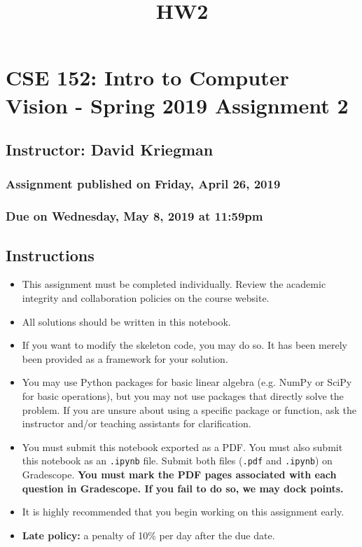 \documentclass[11pt]{article}
\title{HW2}
\providecommand{\tightlist}{%
      \setlength{\itemsep}{0pt}\setlength{\parskip}{0pt}}
\begin{document}
    
    
    \maketitle
    
    

    
    \section{CSE 152: Intro to Computer Vision - Spring 2019 Assignment
2}\label{cse-152-intro-to-computer-vision---spring-2019-assignment-2}

\subsection{Instructor: David Kriegman}\label{instructor-david-kriegman}

\subsubsection{Assignment published on Friday, April 26,
2019}\label{assignment-published-on-friday-april-26-2019}

\subsubsection{Due on Wednesday, May 8, 2019 at
11:59pm}\label{due-on-wednesday-may-8-2019-at-1159pm}

\subsection{Instructions}\label{instructions}

\begin{itemize}
\tightlist
\item
  This assignment must be completed individually. Review the academic
  integrity and collaboration policies on the course website.
\item
  All solutions should be written in this notebook.
\item
  If you want to modify the skeleton code, you may do so. It has been
  merely been provided as a framework for your solution.
\item
  You may use Python packages for basic linear algebra (e.g. NumPy or
  SciPy for basic operations), but you may not use packages that
  directly solve the problem. If you are unsure about using a specific
  package or function, ask the instructor and/or teaching assistants for
  clarification.
\item
  You must submit this notebook exported as a PDF. You must also submit
  this notebook as an \texttt{.ipynb} file. Submit both files
  (\texttt{.pdf} and \texttt{.ipynb}) on Gradescope. \textbf{You must
  mark the PDF pages associated with each question in Gradescope. If you
  fail to do so, we may dock points.}
\item
  It is highly recommended that you begin working on this assignment
  early.
\item
  \textbf{Late policy:} a penalty of 10\% per day after the due date.
\end{itemize}
\end{document}
